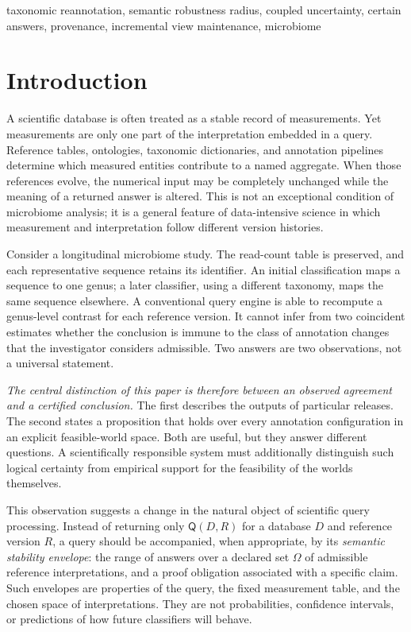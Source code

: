 \documentclass[conference]{IEEEtran}
\newcommand{\OO}{\mathcal{\Omega}}
\newcommand{\Q}{\mathsf{Q}}
\begin{document}
\begin{IEEEkeywords}
taxonomic reannotation, semantic robustness radius, coupled uncertainty, certain answers, provenance, incremental view maintenance, microbiome
\end{IEEEkeywords}

\section{Introduction}
\label{sec:intro}
A scientific database is often treated as a stable record of measurements. Yet measurements are only one part of the interpretation embedded in a query. Reference tables, ontologies, taxonomic dictionaries, and annotation pipelines determine which measured entities contribute to a named aggregate. When those references evolve, the numerical input may be completely unchanged while the meaning of a returned answer is altered. This is not an exceptional condition of microbiome analysis; it is a general feature of data-intensive science in which measurement and interpretation follow different version histories.

Consider a longitudinal microbiome study. The read-count table is preserved, and each representative sequence retains its identifier. An initial classification maps a sequence to one genus; a later classifier, using a different taxonomy, maps the same sequence elsewhere. A conventional query engine is able to recompute a genus-level contrast for each reference version. It cannot infer from two coincident estimates whether the conclusion is immune to the class of annotation changes that the investigator considers admissible. Two answers are two observations, not a universal statement.

\emph{The central distinction of this paper is therefore between an observed agreement and a certified conclusion.} The first describes the outputs of particular releases. The second states a proposition that holds over every annotation configuration in an explicit feasible-world space. Both are useful, but they answer different questions. A scientifically responsible system must additionally distinguish such logical certainty from empirical support for the feasibility of the worlds themselves.

This observation suggests a change in the natural object of scientific query processing. Instead of returning only $\Q(D,R)$ for a database $D$ and reference version $R$, a query should be accompanied, when appropriate, by its \emph{semantic stability envelope}: the range of answers over a declared set $\OO$ of admissible reference interpretations, and a proof obligation associated with a specific claim. Such envelopes are properties of the query, the fixed measurement table, and the chosen space of interpretations. They are not probabilities, confidence intervals, or predictions of how future classifiers will behave.
\end{document}
